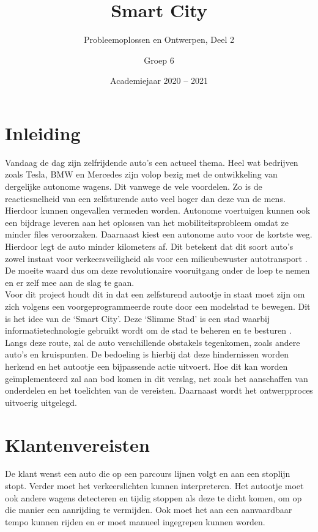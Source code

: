 \documentclass[a4paper,twoside,kulak]{kulakreport} %
\title{Smart City}
\subtitle{Probleemoplossen en Ontwerpen, Deel 2}
\author{Groep 6}
\institute {Aaron Vandenberghe, Dieter Demuynck, Jolien Barbier\\  
	Mathis Bossuyt, Rani Jans en Sarah De Meester \\~\\ 
	o.l.v. Benjamin Maveau, Kevin Truyaert en Martijn Boussé}
\date{Academiejaar 2020 -- 2021}
\begin{document}

\titlepage 
\tableofcontents
\renewcommand\thesection{\arabic{section}}
\renewcommand\thesubsection{\thesection.\arabic{subsection}}
\newpage
\section*{Inleiding}\label{Inleiding}
Vandaag de dag zijn zelfrijdende auto's een actueel thema. Heel wat bedrijven zoals Tesla, BMW en Mercedes zijn volop bezig met de ontwikkeling van dergelijke autonome wagens. Dit vanwege de vele voordelen. Zo is de reactiesnelheid van een zelfsturende auto veel hoger dan deze van de mens. Hierdoor kunnen ongevallen vermeden worden. Autonome voertuigen kunnen ook een bijdrage leveren aan het oplossen van het mobiliteitsprobleem omdat ze minder files veroorzaken. Daarnaast kiest een autonome auto voor de kortste weg. Hierdoor legt de auto minder kilometers af. Dit betekent dat dit soort auto's zowel instaat voor verkeersveiligheid als voor een milieubewuster autotransport \cite{AutonomeAutos1, AutonomeAutos2}. De moeite waard dus om deze revolutionaire vooruitgang onder de loep te nemen en er zelf mee aan de slag te gaan.\\
Voor dit project houdt dit in dat een zelfsturend autootje in staat moet zijn om zich volgens een voorgeprogrammeerde route door een modelstad te bewegen. Dit is het idee van de `Smart City'. Deze `Slimme Stad' is een stad waarbij informatietechnologie gebruikt wordt om de stad te beheren en te besturen \cite{SmartCity}. Langs deze route, zal de auto verschillende obstakels tegenkomen, zoals andere auto's en kruispunten. De bedoeling is hierbij dat deze hindernissen worden herkend en het autootje een bijpassende actie uitvoert. Hoe dit kan worden geïmplementeerd zal aan bod komen in dit verslag, net zoals het aanschaffen van onderdelen en het toelichten van de vereisten. Daarnaast wordt het ontwerpproces uitvoerig uitgelegd. 


\section{Klantenvereisten} \label{Klantenvereisten}
De klant wenst een auto die op een parcours lijnen volgt en aan een stoplijn stopt. Verder moet het verkeerslichten kunnen interpreteren. Het autootje moet ook andere wagens detecteren en tijdig stoppen als deze te dicht komen, om op die manier een aanrijding te vermijden. Ook moet het aan een aanvaardbaar tempo kunnen rijden en er moet manueel ingegrepen kunnen worden.
\end{document}
